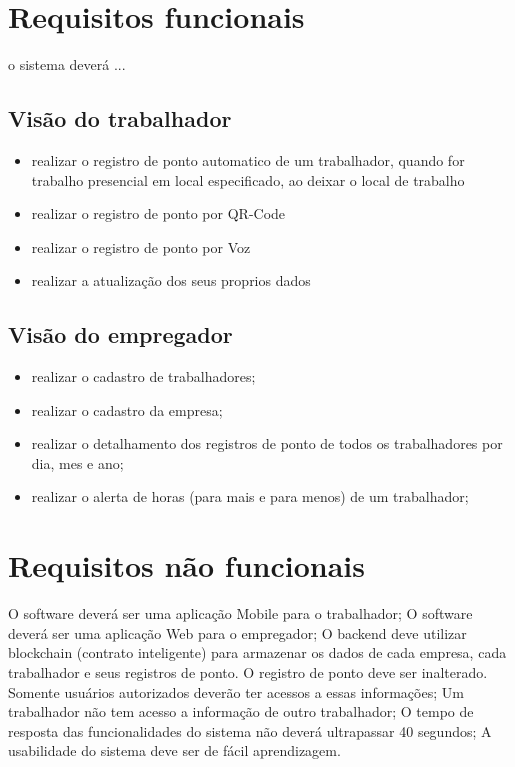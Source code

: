 \documentclass[12pt,openright,twoside,a4paper,english, brazil]{abntex2} %
\begin{document}



\section{Requisitos funcionais}

o sistema deverá ...


\subsection{Visão do trabalhador}

\begin{itemize}
\item realizar o registro de ponto automatico de um trabalhador, quando for trabalho presencial em local especificado, ao deixar o local de trabalho
\item realizar o registro de ponto por QR-Code
\item realizar o registro de ponto por Voz
\item realizar a atualização dos seus proprios dados
\end{itemize}
\subsection{Visão do empregador}
\begin{itemize}
\item realizar o cadastro de trabalhadores;
\item realizar o cadastro da empresa;
\item realizar o detalhamento dos registros de ponto de todos os trabalhadores por dia, mes e ano;
\item realizar o alerta de horas (para mais e para menos) de um trabalhador;
\end{itemize}

\section{Requisitos não funcionais}

O software deverá ser uma aplicação Mobile para o trabalhador;
O software deverá ser uma aplicação Web para o empregador;
O backend deve utilizar blockchain (contrato inteligente) para armazenar os dados de cada empresa, cada trabalhador e seus registros de ponto.
O registro de ponto deve ser inalterado.
Somente usuários autorizados deverão ter acessos a essas informações;
Um trabalhador não tem acesso a informação de outro trabalhador;
O tempo de resposta das funcionalidades do sistema não deverá ultrapassar 40 segundos;
A usabilidade do sistema deve ser de fácil aprendizagem.
\end{document}
